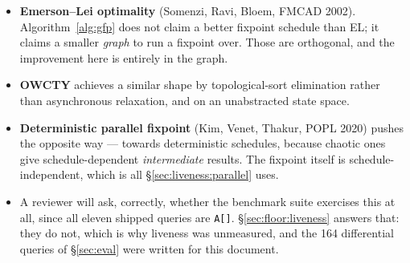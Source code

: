 \begin{itemize}
  \item \textbf{Emerson--Lei optimality} (Somenzi, Ravi, Bloem, FMCAD 2002). Algorithm~\ref{alg:gfp}
        does not claim a better fixpoint schedule than EL; it claims a smaller \emph{graph} to run a
        fixpoint over. Those are orthogonal, and the improvement here is entirely in the graph.
  \item \textbf{OWCTY} achieves a similar shape by topological-sort elimination rather than
        asynchronous relaxation, and on an unabstracted state space.
  \item \textbf{Deterministic parallel fixpoint} (Kim, Venet, Thakur, POPL 2020) pushes the opposite
        way --- towards deterministic schedules, because chaotic ones give schedule-dependent
        \emph{intermediate} results. The fixpoint itself is schedule-independent, which is all
        \S\ref{sec:liveness:parallel} uses.
  \item A reviewer will ask, correctly, whether the benchmark suite exercises this at all, since all
        eleven shipped queries are \texttt{A[]}. \S\ref{sec:floor:liveness} answers that: they do
        not, which is why liveness was unmeasured, and the 164 differential queries of
        \S\ref{sec:eval} were written for this document.
\end{itemize}
